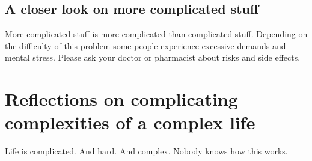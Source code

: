 \documentclass{article}
\begin{document}
	\subsection{A closer look on more complicated stuff}
	More complicated stuff is more complicated than complicated stuff.
	Depending on the difficulty of this problem some people experience excessive demands and mental stress.
	Please ask your doctor or pharmacist about risks and side effects.
	
	\newpage
	
	\section{Reflections on complicating complexities of a complex life}	
	Life is complicated. And hard. And complex. Nobody knows how this works.
	
\end{document}
